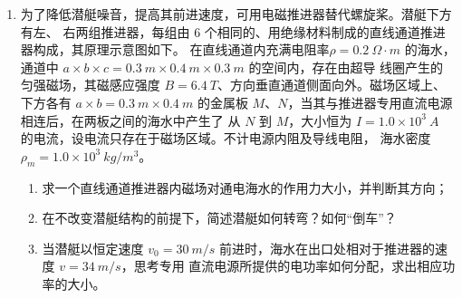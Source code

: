 \begin{enumerate}
\item 
{}
为了降低潜艇噪音，提高其前进速度，可用电磁推进器替代螺旋桨。潜艇下方有左、
右两组推进器，每组由 $ 6 $ 个相同的、用绝缘材料制成的直线通道推进器构成，其原理示意图如下。
在直线通道内充满电阻率$ \rho =0.2 \ \Omega \cdot m $ 的海水，通道中 $ a \times b \times c=0.3 \ m \times 0.4 \ m \times 0.3 \ m $ 的空间内，存在由超导
线圈产生的匀强磁场，其磁感应强度 $ B=6.4 \ T $、方向垂直通道侧面向外。磁场区域上、下方各有
$ a \times b=0.3 \ m \times 0.4 \ m $ 的金属板 $ M $、$ N $，当其与推进器专用直流电源相连后，在两板之间的海水中产生了
从 $ N $ 到 $ M $，大小恒为 $ I=1.0 \times 10^{3} \ A $ 的电流，设电流只存在于磁场区域。不计电源内阻及导线电阻，
海水密度$ \rho _{m}=1.0 \times 10^{3} \ kg/m^{3} $。
\begin{enumerate}
	\item
求一个直线通道推进器内磁场对通电海水的作用力大小，并判断其方向；

\item 
在不改变潜艇结构的前提下，简述潜艇如何转弯？如何“倒车”？

\item 
当潜艇以恒定速度 $ v_{0} =30 \ m /s $ 前进时，海水在出口处相对于推进器的速度 $ v=34 \ m /s $，思考专用
直流电源所提供的电功率如何分配，求出相应功率的大小。

	
\end{enumerate}
\begin{figure}[h!]
	\centering
	
\end{figure}




\end{enumerate}
